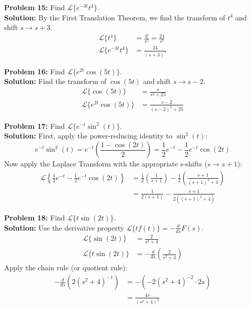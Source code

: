 \documentclass[11pt, letterpaper]{article}
\theoremstyle{definition}
\theoremstyle{remark}
\begin{document}
\vspace{1em}
\textbf{Problem 15:} Find $\mathscr{L}\{e^{-3t}t^4\}$.
\vspace{0.5em} \\
\textbf{Solution:} By the First Translation Theorem, we find the transform of $t^4$ and shift $s \to s + 3$.
\begin{align*}
    \mathscr{L}\{t^4\} &= \frac{4!}{s^5} = \frac{24}{s^5} \\[4pt]
    \mathscr{L}\{e^{-3t}t^4\} &= \frac{24}{(s + 3)^5}
\end{align*}

\vspace{1em}
\textbf{Problem 16:} Find $\mathscr{L}\{e^{2t}\cos(5t)\}$.
\vspace{0.5em} \\
\textbf{Solution:} Find the transform of $\cos(5t)$ and shift $s \to s - 2$.
\begin{align*}
    \mathscr{L}\{\cos(5t)\} &= \frac{s}{s^2 + 25} \\[4pt]
    \mathscr{L}\{e^{2t}\cos(5t)\} &= \frac{s - 2}{(s - 2)^2 + 25}
\end{align*}

\vspace{1em}
\textbf{Problem 17:} Find $\mathscr{L}\{e^{-t}\sin^2(t)\}$.
\vspace{0.5em} \\
\textbf{Solution:} First, apply the power-reducing identity to $\sin^2(t)$:
\[
e^{-t}\sin^2(t) = e^{-t}\left(\frac{1 - \cos(2t)}{2}\right) = \frac{1}{2}e^{-t} - \frac{1}{2}e^{-t}\cos(2t)
\]
Now apply the Laplace Transform with the appropriate s-shifts ($s \to s + 1$):
\begin{align*}
    \mathscr{L}\left\{\frac{1}{2}e^{-t} - \frac{1}{2}e^{-t}\cos(2t)\right\} &= \frac{1}{2}\left(\frac{1}{s + 1}\right) - \frac{1}{2}\left(\frac{s + 1}{(s + 1)^2 + 4}\right) \\[4pt]
    &= \frac{1}{2(s + 1)} - \frac{s + 1}{2((s + 1)^2 + 4)}
\end{align*}

\vspace{1em}
\textbf{Problem 18:} Find $\mathscr{L}\{t\sin(2t)\}$.
\vspace{0.5em} \\
\textbf{Solution:} Use the derivative property $\mathscr{L}\{tf(t)\} = -\frac{d}{ds}F(s)$.
\begin{align*}
    \mathscr{L}\{\sin(2t)\} &= \frac{2}{s^2 + 4} \\[4pt]
    \mathscr{L}\{t\sin(2t)\} &= -\frac{d}{ds}\left(\frac{2}{s^2 + 4}\right)
\end{align*}
Apply the chain rule (or quotient rule):
\begin{align*}
    -\frac{d}{ds}\left(2(s^2 + 4)^{-1}\right) &= - \left(-2(s^2 + 4)^{-2} \cdot 2s\right) \\[4pt]
    &= \frac{4s}{(s^2 + 4)^2}
\end{align*}
\end{document}
